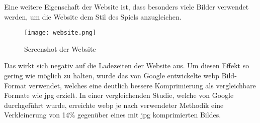 Eine weitere Eigenschaft der \FF Website ist, dass besonders viele Bilder verwendet werden, um die Website dem Stil des
Spiels anzugleichen.

\begin{figure}[H]
    \centering
    \texttt{[image: website.png]}
    \caption{Screenshot der Website}
\end{figure}

Das wirkt sich negativ auf die Ladezeiten der Website aus.
Um diesen Effekt so gering wie möglich zu halten, wurde das von Google entwickelte webp Bild-Format verwendet, welches
eine deutlich bessere Komprimierung als vergleichbare Formate wie \zB jpg erzielt.
In einer vergleichenden Studie, welche von Google durchgeführt wurde, erreichte webp je nach verwendeter Methodik eine
Verkleinerung von 14\% gegenüber eines mit jpg komprimierten Bildes.

\renewcommand{\kapitelautor}{}
